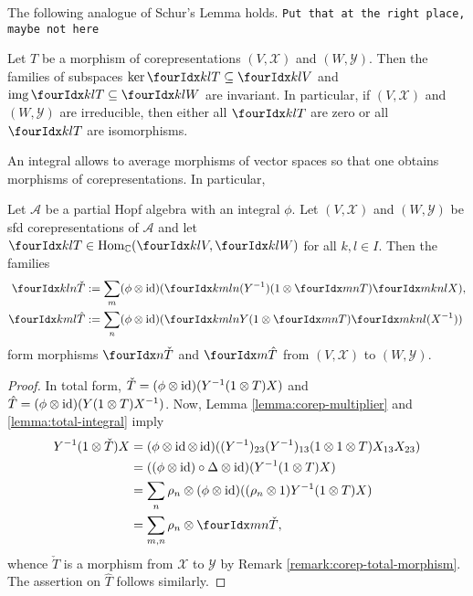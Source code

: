 The following analogue of Schur's Lemma holds. \texttt{Put that at the
right place, maybe not here}

\begin{Lem} Let $T$ be a morphism of corepresentations
  $(V,\mathscr{X})$ and $(W,\mathscr{Y})$. Then the families of
  subspaces $\ker \Gru{T}{k}{l} \subseteq \Gru{V}{k}{l}$ and
  $\img\Gru{T}{k}{l} \subseteq \Gru{W}{k}{l}$ are invariant.  In
  particular, if $(V,\mathscr{X})$ and $(W,\mathscr{Y})$ are
  irreducible, then either all $\Gru{T}{k}{l}$ are zero  or all
  $\Gru{T}{k}{l}$ are  isomorphisms.
\end{Lem} 

An integral allows to average morphisms of vector spaces so that one
obtains morphisms of corepresentations. In particular, 
\begin{Lem} \label{lem:rep-average} Let $\mathscr{A}$ be a partial
  Hopf algebra with an integral $\phi$. Let $(V,\mathscr{X})$ and
  $(W,\mathscr{Y})$ be sfd corepresentations of $\mathscr{A}$ and let
  $\Gru{T}{k}{l} \in \Hom_{\C}(\Gru{V}{k}{l},\Gru{W}{k}{l})$ for all $k,l\in I$. Then the families
  \begin{align*}
    \Gr{\check T}{k}{l}{}{n} &:= \sum_{m} (\phi \otimes
    \id)(\Gr{(Y^{-1})}{k}{l}{m}{n}(1\otimes
    \Gru{T}{m}{n})\Gr{X}{m}{n}{k}{l}), \\
    \Gr{\hat T}{k}{l}{m}{} &:= \sum_{n} (\phi \otimes
    \id)(\Gr{Y}{k}{l}{m}{n}(1\otimes
    \Gru{T}{m}{n})\Gr{(X^{-1})}{m}{n}{k}{l})
  \end{align*}
form  morphisms $\Grd{\check{T}}{}{n}$ and $\Grd{\hat{T}}{m}{}$ from $(V,\mathscr{X})$ to $(W,\mathscr{Y})$. %
\end{Lem} 
\begin{proof}
  In total form, $\check{T}=(\phi \otimes \operatorname{id})(Y^{-1}(1 \otimes T)X)$
  and $\hat{T}=(\phi \otimes \operatorname{id})(Y(1 \otimes T)X^{-1})$.  Now, Lemma
  \ref{lemma:corep-multiplier} and \ref{lemma:total-integral} 
  imply
  \begin{align*}
    Y^{-1}(1 \otimes \check{T})X &= (\phi \otimes \id \otimes
    \id)((Y^{-1})_{23}(Y^{-1})_{13}(1 \otimes 1
    \otimes T)X_{13}X_{23})  \\
    &= ((\phi \otimes\id) \circ \Delta  \otimes \id)(Y^{-1}(1 \otimes T)X) \\
    &= \sum_{n} \rho_{n} \otimes (\phi \otimes \id)((\rho_{n} \otimes
    1)Y^{-1}(1 \otimes T)X)  \\
    &= \sum_{m,n} \rho_{n} \otimes \Gru{\check T}{m}{n},
  \end{align*}
  whence $\check{T}$ is a morphism from $\mathscr{X}$ to $\mathscr{Y}$
  by Remark \ref{remark:corep-total-morphism}. The assertion on $\hat
  T$ follows similarly.
\end{proof}

